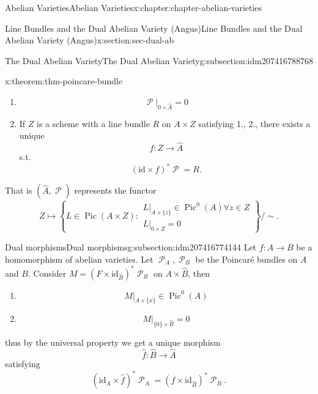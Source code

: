 \documentclass[oneside,10pt,]{book}
\numberwithin{equation}{section}
\newcommand{\sheaf}[1]{\operatorname{\mathcal{#1}}}
\newcommand{\id}{\mathrm{id}}
\DeclareMathOperator{\Pic}{Pic}
\begin{document}
\begin{chapterptx}{Abelian Varieties}{}{Abelian Varieties}{}{}{x:chapter:chapter-abelian-varieties}
\begin{sectionptx}{Line Bundles and the Dual Abelian Variety (Angus)}{}{Line Bundles and the Dual Abelian Variety (Angus)}{}{}{x:section:sec-dual-ab}
\begin{subsectionptx}{The Dual Abelian Variety}{}{The Dual Abelian Variety}{}{}{g:subsection:idm207416788768}
\begin{theorem}{}{}{x:theorem:thm-poincare-bundle}
\begin{enumerate}
%
\item{}%
\begin{equation*}
\sheaf P|_{0\times \hat A} = 0
\end{equation*}
%
\item{}If \(Z\) is a  scheme with a line bundle \(R\) on \(A\times Z\) satisfying 1., 2., there exists a unique%
\begin{equation*}
f\colon Z\to \hat A
\end{equation*}
s.t.%
\begin{equation*}
(\id\times f)^* \sheaf P = R\text{.}
\end{equation*}
%
\end{enumerate}
That is \((\hat A, \sheaf P)\)  represents the functor%
\begin{equation*}
Z \mapsto \left\{ L\in \Pic (A\times Z) : \substack{ L|_{A\times \{z\}} \in \Pic^0(A) \forall z\in Z \\L|_{ 0 \times Z } = 0}\right\}/\sim\text{.}
\end{equation*}
%
\end{theorem}
\end{subsectionptx}
%
%
\typeout{************************************************}
\typeout{************************************************}
%
\begin{subsectionptx}{Dual morphisms}{}{Dual morphisms}{}{}{g:subsection:idm207416774144}
Let \(f\colon A\to B\) be a homomorphism of abelian varieties. Let \(\sheaf P_A,\sheaf P_B\) be the Poincaré bundles on  \(A\) and \(B\). Consider \(M=    (F\times \id_{\hat B})^* \sheaf P_B\) on \(A\times \hat B\), then%
\begin{enumerate}
\item{}%
\begin{equation*}
M|_{A\times \{x\}} \in \Pic^0(A)
\end{equation*}
%
\item{}%
\begin{equation*}
M|_{\{0\} \times \hat B} = 0
\end{equation*}
%
\end{enumerate}
thus by the universal property we get a unique morphism%
\begin{equation*}
\hat f\colon \hat B \to \hat A
\end{equation*}
satisfying%
\begin{equation*}
(\id_A\times \hat f)^* \sheaf P_A = (f\times \id_{\hat B})^*\sheaf P_B\text{.}
\end{equation*}

\end{subsectionptx}
\end{sectionptx}
\end{chapterptx}
\end{document}
